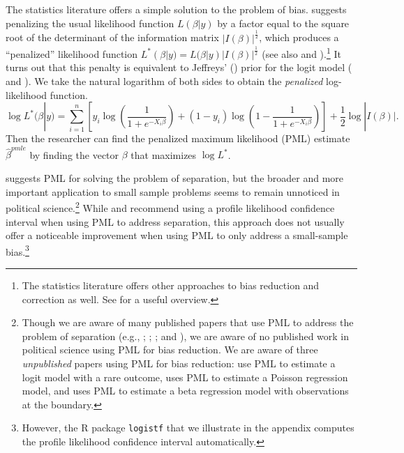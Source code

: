 \documentclass[12pt]{article}
\begin{document}
The statistics literature offers a simple solution to the problem of bias.
\cite{Firth1993} suggests penalizing the usual likelihood function $L(\beta | y)$ by a factor equal to the square root of the determinant of the information matrix $|I(\beta)|^\frac{1}{2}$, which produces a ``penalized'' likelihood function $L^*(\beta | y) = L(\beta | y)|I(\beta)|^\frac{1}{2}$ (see also \citealt{KosmidisFirth2009} and \citealt{Kosmidis2014}).\footnote{The statistics literature offers other approaches to bias reduction and correction as well. 
See \cite{Kosmidis2014} for a useful overview.}
It turns out that this penalty is equivalent to Jeffreys' (\citeyear{Jeffreys1946}) prior for the logit model (\citealt{Firth1993} and \citealt{Poirier1994}).
We take the natural logarithm of both sides to obtain the \textit{penalized} log-likelihood function.
\begin{equation}\nonumber
\log L^*(\beta | y) = \displaystyle \sum_{i = 1}^n \left[y_i \log \left( \dfrac{1}{1 + e^{-X_i\beta}}\right) + (1 - y_i) \log \left(1 - \dfrac{1}{1 + e^{-X_i\beta}}\right)\right] + \dfrac{1}{2} \log |I(\beta)|.
\end{equation}
Then the researcher can find the penalized maximum likelihood (PML) estimate $\hat{\beta}^{pmle}$ by finding the vector $\beta$ that maximizes $\log L^*$.

\cite{Zorn2005} suggests PML for solving the problem of separation,
but the broader and more important application to small sample problems seems to remain unnoticed in political science.\footnote{Though we are aware of many published papers that use PML to address the problem of separation (e.g., \citealt{BellMiller2015}; \citealt{ViningWilhelmCollens2015}; \citealt{LeemanMares2014}; and \citealt{BarrilleauxRainey2014}), we are aware of no published work in political science using PML for bias reduction. 
We are aware of three \textit{unpublished} papers using PML for bias reduction: \cite{KaplowGartzke2015} use PML to estimate a logit model with a rare outcome, \cite{Betz2015b} uses PML to estimate a Poisson regression model, and \cite{Betz2015a} uses PML to estimate a beta regression model with observations at the boundary.} 
While \cite{HeinzeSchemper2002} and \cite{Zorn2005} recommend using a profile likelihood confidence interval when using PML to address separation, this approach does not usually offer a noticeable improvement when using PML to only address a small-sample bias.\footnote{However, the R package \texttt{logistf} \citep{logistf} that we illustrate in the appendix computes the profile likelihood confidence interval automatically.}
\end{document}
